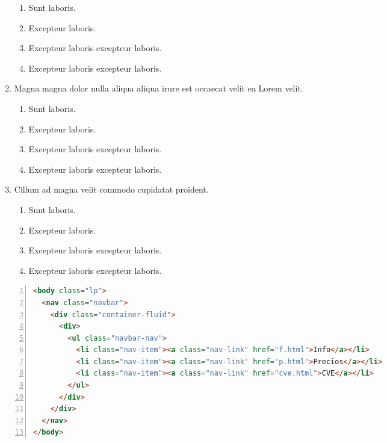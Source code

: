 \documentclass[a4paper,12pt]{article}
\begin{document}
\begin{enumerate}[label=\textbf{\arabic*.}]
  \begin{enumerate}
    \item Sunt laboris.
    \item Excepteur laboris.
    \item Excepteur laboris excepteur laboris.
    \item Excepteur laboris excepteur laboris.
  \end{enumerate}
  \item Magna magna dolor nulla aliqua aliqua irure est occaecat velit ea Lorem velit.
  \begin{enumerate}
    \item Sunt laboris.
    \item Excepteur laboris.
    \item Excepteur laboris excepteur laboris.
    \item Excepteur laboris excepteur laboris.
  \end{enumerate}
  \item Cillum ad magna velit commodo cupidatat proident.
  \begin{enumerate}
    \item Sunt laboris.
    \item Excepteur laboris.
    \item Excepteur laboris excepteur laboris.
    \item Excepteur laboris excepteur laboris.
  \end{enumerate}
\end{enumerate}

\newpage
\begin{lstlisting}[language=HTML, caption={Documento en HTML}, label={lst:1}, numbers=left]
<body class="lp">
  <nav class="navbar">
    <div class="container-fluid">
      <div>
        <ul class="navbar-nav">
          <li class="nav-item"><a class="nav-link" href="f.html">Info</a></li>
          <li class="nav-item"><a class="nav-link" href="p.html">Precios</a></li>
          <li class="nav-item"><a class="nav-link" href="cve.html">CVE</a></li>
        </ul>
      </div>
    </div>
  </nav>
</body>
\end{lstlisting}
\end{document}
